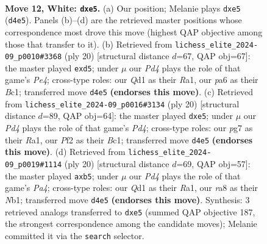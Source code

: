 \documentclass[11pt]{article}
\begin{document}
\clearpage

\begin{figure}[p]\centering
\begin{subfigure}{0.46\textwidth}\centering
\resizebox{\linewidth}{!}{%
\newchessgame
\chessboard[
  setfen={r2q2k1/1bp2rpp/pbnp1n2/1p2p3/3PP3/1BP5/PP3PPP/RNBQR1K1 w - - 0 12},
  showmover=false,
  pgfstyle=straightmove, color=movearrow, markmove={d4-e5}
]}
\caption{}
\end{subfigure}\hfill
\begin{subfigure}{0.46\textwidth}\centering
\resizebox{\linewidth}{!}{%
\newchessgame
\chessboard[
  setfen={r2q1rk1/ppp2pp1/2n1bn1p/3pp3/4P3/1BPP3P/P1P2PPN/R1BQ1RK1 w - - 0 11},
  showmover=false,
  pgfstyle=straightmove, color=movearrow, markmove={e4-d5}
]}
\caption{}
\end{subfigure}
\\[4pt]
\begin{subfigure}{0.46\textwidth}\centering
\resizebox{\linewidth}{!}{%
\newchessgame
\chessboard[
  setfen={r2q1rk1/pppn1pbp/2np2p1/4p3/2PP4/2N1PBPP/PP3P2/R1BQ1RK1 w - - 0 11},
  showmover=false,
  pgfstyle=straightmove, color=movearrow, markmove={d4-e5}
]}
\caption{}
\end{subfigure}\hfill
\begin{subfigure}{0.46\textwidth}\centering
\resizebox{\linewidth}{!}{%
\newchessgame
\chessboard[
  setfen={rn1q1rk1/1bp1bppp/p2p1n2/1p2p3/P3P3/1BPP1N1P/1P3PP1/RNBQ1RK1 w - - 1 11},
  showmover=false,
  pgfstyle=straightmove, color=movearrow, markmove={a4-b5}
]}
\caption{}
\end{subfigure}
\caption{\textbf{Move 12, White: \texttt{dxe5}.} (a) Our position; Melanie plays \texttt{dxe5} (\texttt{d4e5}). Panels (b)--(d) are the retrieved master positions whose correspondence most drove this move (highest QAP objective among those that transfer to it). (b) Retrieved from \texttt{lichess\_elite\_2024-09\_p0010\#3368} (ply 20) [structural distance $d$=67, QAP obj=67]: the master played \texttt{exd5}; under $\mu$ our \emph{Pd4} plays the role of that game's \emph{Pe4}; cross-type roles: our \emph{Q}d1 as their \emph{R}a1, our \emph{p}a6 as their \emph{B}c1; transferred move \texttt{d4e5} \textbf{(endorses this move)}. (c) Retrieved from \texttt{lichess\_elite\_2024-09\_p0016\#3134} (ply 20) [structural distance $d$=89, QAP obj=64]: the master played \texttt{dxe5}; under $\mu$ our \emph{Pd4} plays the role of that game's \emph{Pd4}; cross-type roles: our \emph{p}g7 as their \emph{R}a1, our \emph{P}f2 as their \emph{B}c1; transferred move \texttt{d4e5} \textbf{(endorses this move)}. (d) Retrieved from \texttt{lichess\_elite\_2024-09\_p0019\#1114} (ply 20) [structural distance $d$=69, QAP obj=57]: the master played \texttt{axb5}; under $\mu$ our \emph{Pd4} plays the role of that game's \emph{Pa4}; cross-type roles: our \emph{Q}d1 as their \emph{R}a1, our \emph{r}a8 as their \emph{N}b1; transferred move \texttt{d4e5} \textbf{(endorses this move)}. Synthesis: 3 retrieved analogs transferred to \texttt{dxe5} (summed QAP objective 187, the strongest correspondence among the candidate moves); Melanie committed it via the \texttt{search} selector.}
\label{fig:thought-m22}
\end{figure}
\end{document}
